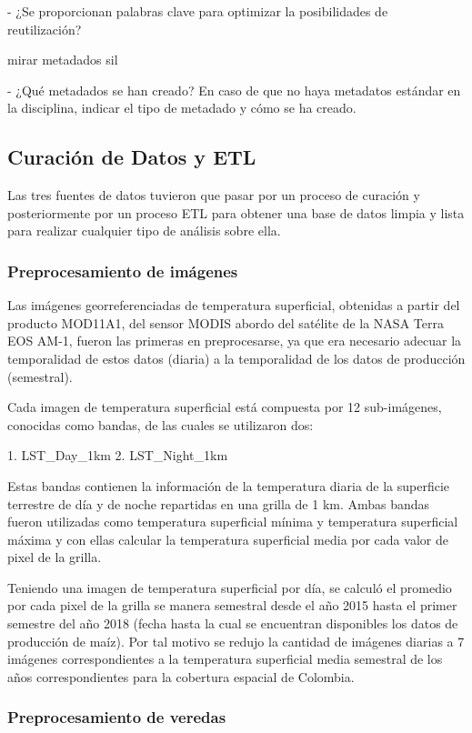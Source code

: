 \documentclass[12pt, spanish]{article}
\begin{document}
- ¿Se proporcionan palabras clave para optimizar la posibilidades de reutilización?

mirar metadados sil

- ¿Qué metadados se han creado? En caso de que no haya metadatos estándar en la disciplina, indicar el tipo de metadado y cómo se ha creado.

\subsection{Curación de Datos y ETL}

Las tres fuentes de datos tuvieron que pasar por un proceso de curación y posteriormente por un proceso ETL para obtener una base de datos limpia y lista para realizar cualquier tipo de análisis sobre ella.

\subsubsection{Preprocesamiento de imágenes}

Las imágenes georreferenciadas de temperatura superficial, obtenidas a partir del producto MOD11A1, del sensor MODIS abordo del satélite de la NASA Terra EOS AM-1, fueron las primeras en preprocesarse, ya que era necesario adecuar la temporalidad de estos datos (diaria) a la temporalidad de los datos de producción (semestral).

Cada imagen de temperatura superficial está compuesta por 12 sub-imágenes, conocidas como bandas, de las cuales se utilizaron dos:

1. LST_Day_1km
2. LST_Night_1km

Estas bandas contienen la información de la temperatura diaria de la superficie terrestre de día y de noche repartidas en una grilla de 1 km. Ambas bandas fueron utilizadas como temperatura superficial mínima y temperatura superficial máxima y con ellas calcular la temperatura superficial media por cada valor de pixel de la grilla.

Teniendo una imagen de temperatura superficial por día, se calculó el promedio por cada pixel de la grilla se manera semestral desde el año 2015 hasta el primer semestre del año 2018 (fecha hasta la cual se encuentran disponibles los datos de producción de maíz). Por tal motivo se redujo la cantidad de imágenes diarias a 7 imágenes correspondientes a la temperatura superficial media semestral de los años correspondientes para la cobertura espacial de Colombia.

\subsubsection{Preprocesamiento de veredas}
\end{document}
